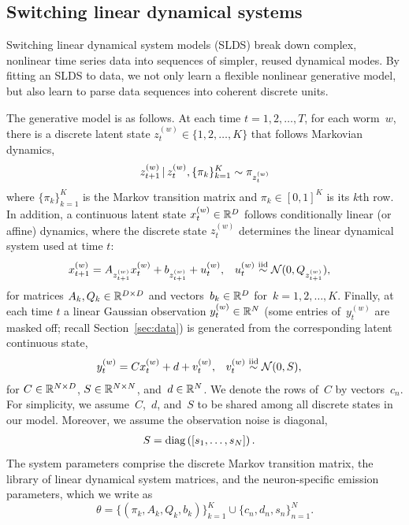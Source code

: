 \documentclass{article}
\begin{document}
\subsection{Switching linear dynamical systems}
\label{sec:slds}
Switching linear dynamical system models (SLDS) break down complex, nonlinear
time series data into sequences of simpler, reused dynamical modes.
By fitting an SLDS to data, we not only learn a flexible nonlinear generative
model, but also learn to parse data sequences into coherent discrete units.

The generative model is as follows. At each time ${t=1,2,\ldots,T}$,
for each worm~$w$,
there is a discrete latent state ${z_t^{(w)} \in \{1,2, \ldots,K\}}$ that
follows Markovian dynamics,
\begin{equation}
  z_{t+1}^{(w)} \,|\, z_t^{(w)}, \{\pi_k\}_{k=1}^K  \sim \pi_{z_t^{(w)}}
  \label{eq:markov_z}
\end{equation}
where ${\{\pi_k\}_{k=1}^K}$ is the Markov transition matrix and
${\pi_k \in [0,1]^K}$ is its $k$th row. 
In addition, a continuous latent state ${x_t^{(w)} \in \mathbb{R}^D}$ follows
conditionally linear (or affine) dynamics, where the discrete state $z_t^{(w)}$
determines the linear dynamical system used at time $t$:
\begin{align}
  x_{t+1}^{(w)} &= A_{z_{t+1}^{(w)}} x_{t}^{(w)} + b_{z_{t+1}^{(w)}} +  u_t^{(w)},
  &
  u_t^{(w)} &\stackrel{\text{iid}}{\sim} \mathcal{N}(0,Q_{z_{t+1}^{(w)}}),
  \label{eq:slds_start}
\end{align}
for matrices ${A_k, Q_k \in \mathbb{R}^{D \times D}}$ and vectors~${b_k\in
\mathbb{R}^D}$ for~${k=1,2,\ldots,K}$.
Finally, at each time $t$ a linear Gaussian observation $y_t^{(w)} \in \mathbb{R}^N$
(some entries of~$y_t^{(w)}$ are masked off; recall Section~\ref{sec:data}) is
generated from the corresponding latent continuous state,
\begin{align}
  y_t^{(w)} &= C x_t^{(w)} + d + v_t^{(w)}, & v_t^{(w)} &\stackrel{\text{iid}}{\sim} \mathcal{N}(0,S),
    \label{eq:slds_end}
\end{align}
for $C \in \mathbb{R}^{N \times D}$, $S \in \mathbb{R}^{N \times N}$,
and~$d \in \mathbb{R}^N$. We denote the rows of~$C$ by vectors~$c_n$.
For simplicity, we assume~$C$,~$d$, and~$S$ to
be shared among all discrete states in our model.  Moreover, we assume
the observation noise is diagonal,
\begin{align*}
  S &= \textrm{diag}\left(\left[s_{1}, \ldots, s_{N} \right] \right). 
\end{align*}
The system parameters comprise the discrete Markov transition matrix, the
library of linear dynamical system matrices, and the neuron-specific
emission parameters, which we write as
\begin{equation*}
  \theta = \{(\pi_k, A_k, Q_k, b_k)\}_{k=1}^K \cup \{c_n, d_n, s_n\}_{n=1}^N.
\end{equation*}
\end{document}
